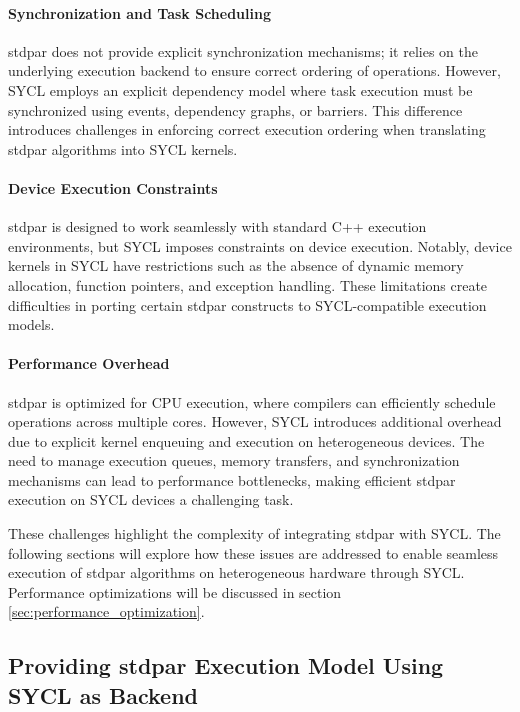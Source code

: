 \paragraph{Synchronization and Task Scheduling} 
stdpar does not provide explicit synchronization mechanisms; it relies on the underlying execution backend to
ensure correct ordering of operations. However, SYCL employs an explicit dependency model where task execution
must be synchronized using events, dependency graphs, or barriers. This difference introduces challenges in
enforcing correct execution ordering when translating stdpar algorithms into SYCL kernels.

\paragraph{Device Execution Constraints} 
stdpar is designed to work seamlessly with standard C++ execution environments, but SYCL imposes constraints
on device execution. Notably, device kernels in SYCL have restrictions such as the absence of dynamic memory
allocation, function pointers, and exception handling. These limitations create difficulties in porting certain stdpar
constructs to SYCL-compatible execution models.

\paragraph{Performance Overhead} 
stdpar is optimized for CPU execution, where compilers can efficiently schedule operations across multiple cores.
However, SYCL introduces additional overhead due to explicit kernel enqueuing and execution on heterogeneous
devices. The need to manage execution queues, memory transfers, and synchronization mechanisms can lead to
performance bottlenecks, making efficient stdpar execution on SYCL devices a challenging task.

These challenges highlight the complexity of integrating stdpar with SYCL. The following sections will explore how
these issues are addressed to enable seamless execution of stdpar algorithms on heterogeneous hardware
through SYCL. Performance optimizations will be discussed in section \ref{sec:performance_optimization}.






\subsection{Providing stdpar Execution Model Using SYCL as Backend}
\label{sec:stdpar_to_sycl}


